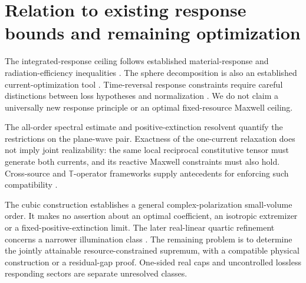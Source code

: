 \documentclass[11pt]{article}
\begin{document}
\section{Relation to existing response bounds and remaining optimization}
The integrated-response ceiling follows established material-response and radiation-efficiency inequalities \citep{Miller2016,Schab2020,Gustafsson2020,Kuang2020}. The sphere decomposition is also an established current-optimization tool \citep{Gustafsson2024}. Time-reversal response constraints require careful distinctions between loss hypotheses and normalization \citep{SounasAlu2017,Ma2025}. We do not claim a universally new response principle or an optimal fixed-resource Maxwell ceiling.

The all-order spectral estimate and positive-extinction resolvent quantify the restrictions on the plane-wave pair. Exactness of the one-current relaxation does not imply joint realizability: the same local reciprocal constitutive tensor must generate both currents, and its reactive Maxwell constraints must also hold. Cross-source and $\mathbb T$-operator frameworks supply antecedents for enforcing such compatibility \citep{Molesky2020,Molesky2022,Shim2024}.

The cubic construction establishes a general complex-polarization small-volume order. It makes no assertion about an optimal coefficient, an isotropic extremizer or a fixed-positive-extinction limit. The later real-linear quartic refinement concerns a narrower illumination class \citep{WangZhengQuartic2026}. The remaining problem is to determine the jointly attainable resource-constrained supremum, with a compatible physical construction or a residual-gap proof. One-sided real caps and uncontrolled lossless responding sectors are separate unresolved classes.

\appendix
\end{document}
